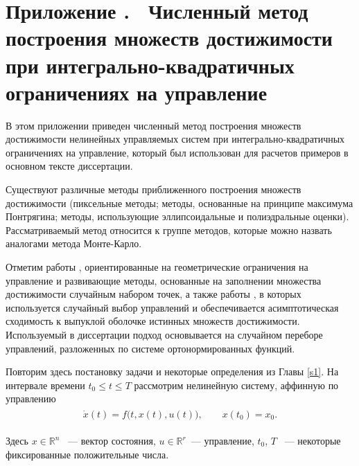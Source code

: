 \documentclass[../main.tex]{subfiles}
\begin{document}
\clearpage
\setcounter{section}{0}%
\renewcommand{\thesection}{\Alph{section}}%
\section*{Приложение .  Численный метод построения множеств достижимости при интегрально-квадратичных ограничениях на управление}%
\label{app:A}%
\renewcommand{\theequation}{\Alph{section}.\arabic{equation}}%
\setcounter{equation}{0}
В этом приложении приведен численный метод построения множеств достижимости нелинейных управляемых систем при интегрально-квадратичных ограничениях на управление, который был использован для расчетов примеров в основном тексте диссертации.

Существуют различные методы приближенного построения множеств достижимости (пиксельные методы; методы, основанные на принципе максимума Понтрягина; методы, использующие эллипсоидальные и полиэдральные оценки).
Рассматриваемый метод относится к группе методов, которые можно назвать аналогами метода Монте-Карло. 
 
Отметим работы \cite{Gornov2015, Gornov2017}, ориентированные на геометрические ограничения на управление и развивающие методы, основанные на заполнении множества достижимости случайным набором точек, а также работы \cite{Lew2020, Lew2022}, в которых используется случайный выбор управлений и обеспечивается асимптотическая сходимость к выпуклой оболочке истинных множеств достижимости.
Используемый в диссертации подход основывается на случайном переборе управлений, разложенных по системе ортонормированных функций.

Повторим здесь постановку задачи и некоторые определения из Главы \ref{s1}.
На интервале времени $ t_0 \leqslant t \leqslant {T} $ рассмотрим нелинейную систему, аффинную по управлению
\begin{gather}\label{a1:common_nonlinear}
	\begin{gathered}
		\dot{x}(t)=f\big(t, x(t), u(t)\big), \qquad x(t_0) = x_0.
	\end{gathered}
\end{gather}

Здесь $ x \in \mathbb{R}^n $ ~--- вектор состояния, $ u \in \mathbb{R}^r $~--- управление, $t_0$, $ {T} $ ~--- некоторые фиксированные положительные числа.
\end{document}

